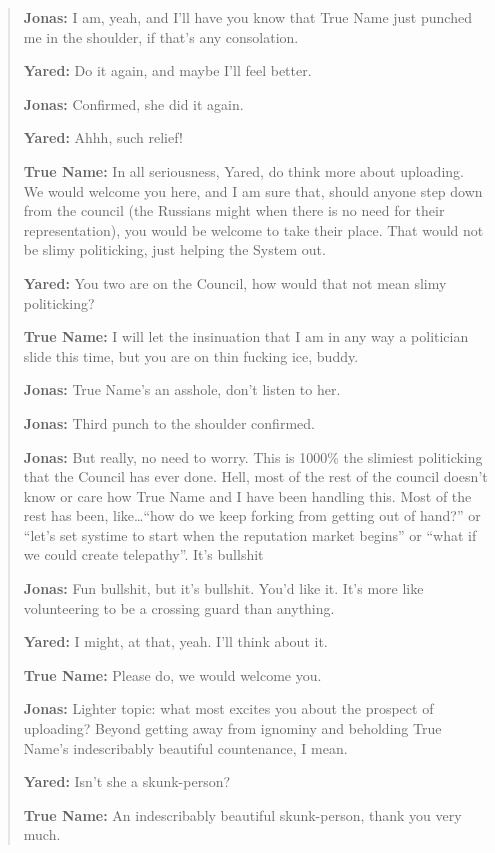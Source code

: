 \begin{quote}
\textbf{Jonas:} I am, yeah, and I'll have you know that True Name just punched me in the shoulder, if that's any consolation.

\textbf{Yared:} Do it again, and maybe I'll feel better.

\textbf{Jonas:} Confirmed, she did it again.

\textbf{Yared:} Ahhh, such relief!

\textbf{True Name:} In all seriousness, Yared, do think more about uploading. We would welcome you here, and I am sure that, should anyone step down from the council (the Russians might when there is no need for their representation), you would be welcome to take their place. That would not be slimy politicking, just helping the System out.

\textbf{Yared:} You two are on the Council, how would that not mean slimy politicking?

\textbf{True Name:} I will let the insinuation that I am in any way a politician slide this time, but you are on thin fucking ice, buddy.

\textbf{Jonas:} True Name's an asshole, don't listen to her.

\textbf{Jonas:} Third punch to the shoulder confirmed.

\textbf{Jonas:} But really, no need to worry. This is 1000\% the slimiest politicking that the Council has ever done. Hell, most of the rest of the council doesn't know or care how True Name and I have been handling this. Most of the rest has been, like\ldots{}``how do we keep forking from getting out of hand?'' or ``let's set systime to start when the reputation market begins'' or ``what if we could create telepathy''. It's bullshit

\textbf{Jonas:} Fun bullshit, but it's bullshit. You'd like it. It's more like volunteering to be a crossing guard than anything.

\textbf{Yared:} I might, at that, yeah. I'll think about it.

\textbf{True Name:} Please do, we would welcome you.

\textbf{Jonas:} Lighter topic: what most excites you about the prospect of uploading? Beyond getting away from ignominy and beholding True Name's indescribably beautiful countenance, I mean.

\textbf{Yared:} Isn't she a skunk-person?

\textbf{True Name:} An indescribably beautiful skunk-person, thank you very much.


\end{quote}
